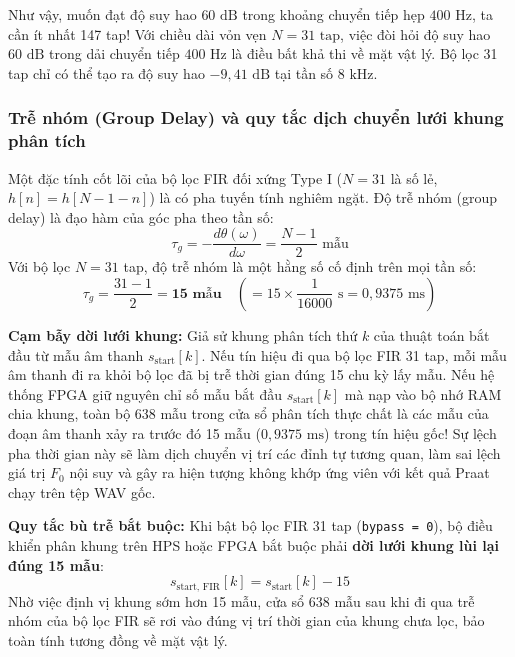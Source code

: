 Như vậy, muốn đạt độ suy hao $60\text{ dB}$ trong khoảng chuyển tiếp hẹp $400\text{ Hz}$, ta cần ít nhất 147 tap! Với chiều dài vỏn vẹn $N = 31\text{ tap}$, việc đòi hỏi độ suy hao $60\text{ dB}$ trong dải chuyển tiếp $400\text{ Hz}$ là điều bất khả thi về mặt vật lý. Bộ lọc 31 tap chỉ có thể tạo ra độ suy hao $-9{,}41\text{ dB}$ tại tần số $8\text{ kHz}$.

\subsubsection*{Trễ nhóm (Group Delay) và quy tắc dịch chuyển lưới khung phân tích}
Một đặc tính cốt lõi của bộ lọc FIR đối xứng Type I ($N = 31$ là số lẻ, $h[n] = h[N - 1 - n]$) là có pha tuyến tính nghiêm ngặt. Độ trễ nhóm (group delay) là đạo hàm của góc pha theo tần số:
\begin{equation}
\tau_g = -\frac{d\theta(\omega)}{d\omega} = \frac{N - 1}{2}\text{ mẫu}
\end{equation}
Với bộ lọc $N = 31$ tap, độ trễ nhóm là một hằng số cố định trên mọi tần số:
\begin{equation}
\tau_g = \frac{31 - 1}{2} = \textbf{15 mẫu} \quad \left(= 15 \times \frac{1}{16000}\text{ s} = 0{,}9375\text{ ms}\right)
\end{equation}

\textbf{Cạm bẫy dời lưới khung:} Giả sử khung phân tích thứ $k$ của thuật toán bắt đầu từ mẫu âm thanh $s_{\text{start}}[k]$. Nếu tín hiệu đi qua bộ lọc FIR 31 tap, mỗi mẫu âm thanh đi ra khỏi bộ lọc đã bị trễ thời gian đúng 15 chu kỳ lấy mẫu.
Nếu hệ thống FPGA giữ nguyên chỉ số mẫu bắt đầu $s_{\text{start}}[k]$ mà nạp vào bộ nhớ RAM chia khung, toàn bộ 638 mẫu trong cửa sổ phân tích thực chất là các mẫu của đoạn âm thanh xảy ra trước đó 15 mẫu ($0{,}9375\text{ ms}$) trong tín hiệu gốc!
Sự lệch pha thời gian này sẽ làm dịch chuyển vị trí các đỉnh tự tương quan, làm sai lệch giá trị $F_0$ nội suy và gây ra hiện tượng không khớp ứng viên với kết quả Praat chạy trên tệp WAV gốc.

\textbf{Quy tắc bù trễ bắt buộc:} Khi bật bộ lọc FIR 31 tap (\texttt{bypass = 0}), bộ điều khiển phân khung trên HPS hoặc FPGA bắt buộc phải \textbf{dời lưới khung lùi lại đúng 15 mẫu}:
\begin{equation}
s_{\text{start, FIR}}[k] = s_{\text{start}}[k] - 15
\end{equation}
Nhờ việc định vị khung sớm hơn 15 mẫu, cửa sổ 638 mẫu sau khi đi qua trễ nhóm của bộ lọc FIR sẽ rơi vào đúng vị trí thời gian của khung chưa lọc, bảo toàn tính tương đồng về mặt vật lý.

